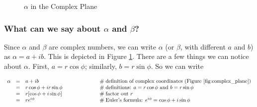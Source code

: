 \documentclass{article}
\theoremstyle{definition}
\begin{document}
\begin{figure}
\centering
  \resizebox{0.50 \textwidth}{!} {                                                              %
  }                                                                                             %
 \caption{$\alpha$ in the Complex Plane}
 \label{fig:complex_plane}
\end{figure}


\subsubsection{What can we say about $\alpha$ and $\beta$?}
\label{subsub:alpha_and_beta}
Since $\alpha$ and $\beta$ are complex numbers, we can write
$\alpha$ (or $\beta$, with different $a$ and $b$) as $\alpha = a
+ ib$. This is depicted in Figure \ref{fig:complex_plane}.  There
are a few things we can notice about $\alpha$. First, $a = r \cos
\phi$; similarly, $b = r \sin \phi$. So we can write

\begin{equation*}
\begin{array}{lllll}
\alpha 
&=& a + ib                              &\qquad \qquad \qquad \mathrel{\#}  \text{definition of complex coordinates (Figure \ref{fig:complex_plane})}  \\
&=&  r \cos \phi + i r \sin \phi        &\qquad \qquad \qquad \mathrel{\#} \text{definitions: $a = r \cos \phi$ and $b = r \sin \phi$} \\
&=&  r [\cos \phi +i \sin \phi]         &\qquad \qquad \qquad \mathrel{\#} \text{factor out  $r$} \\
&=& re^{i\phi}                          &\qquad \qquad \qquad \mathrel{\#} \text{Euler's formula: }  e^{i\phi} = \cos \phi + i \sin \phi
\end{array}
\end{equation*}
\end{document}

